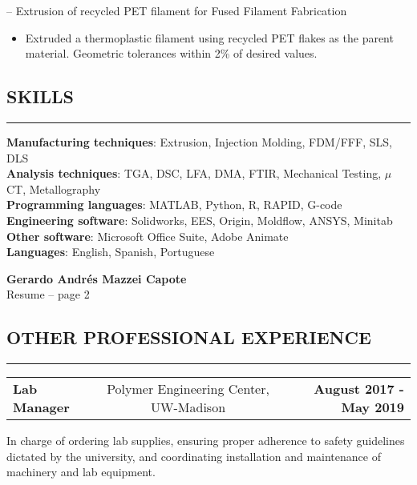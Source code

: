 \documentclass[11pt,letterpaper]{article}
\makeatletter
\newcommand{\headerrow}[3]
{\vspace{0.4em}
\noindent
\begin{tabular*}{\textwidth}{l @{\extracolsep{\fill}} cr}
	\textbf{#1} & %
	#2 &		  %
	\textbf{#3}\\ %
\end{tabular*}}
\makeatother
\begin{document}
		\noindent -- Extrusion of recycled PET filament for Fused Filament Fabrication
		
		\begin{itemize}
			\item Extruded a thermoplastic filament using recycled PET flakes as the parent material. Geometric tolerances within 2\% of desired values.
		\end{itemize}

\subsection*{SKILLS}
\vspace{-0.5em}
\hrule
\vspace{0.4em}

\textbf{Manufacturing techniques}: Extrusion, Injection Molding, FDM/FFF, SLS, DLS\\
\textbf{Analysis techniques}: TGA, DSC, LFA, DMA, FTIR, Mechanical Testing, $\mu$CT, Metallography\\
\textbf{Programming languages}: MATLAB, Python, R, RAPID, G-code\\
\textbf{Engineering software}: Solidworks, EES, Origin, Moldflow, ANSYS, Minitab\\
\textbf{Other software}: Microsoft Office Suite, Adobe Animate\\
\textbf{Languages}: English, Spanish, Portuguese\\

\pagebreak
\thispagestyle{empty} %

\begin{center}
	\LARGE \textbf{Gerardo Andrés Mazzei Capote} \\
	\normalsize Resume -- page 2
\end{center}

\subsection*{OTHER PROFESSIONAL EXPERIENCE}

\vspace{-0.5em}
\hrule

\headerrow
{Lab Manager}
{Polymer Engineering Center, UW-Madison} 
{August 2017 - May 2019}
In charge of ordering lab supplies, ensuring proper adherence to safety guidelines dictated by the university, and coordinating installation and maintenance of machinery and lab equipment.
\end{document}
